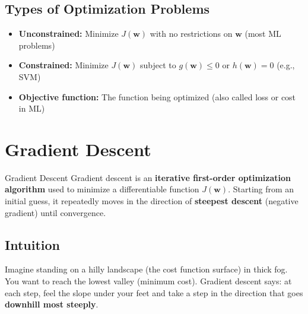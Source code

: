 \documentclass[12pt,a4paper]{report}
\begin{document}
\subsection{Types of Optimization Problems}

\begin{itemize}
  \item \textbf{Unconstrained:} Minimize $J(\mathbf{w})$ with no restrictions on $\mathbf{w}$ (most ML problems)
  \item \textbf{Constrained:} Minimize $J(\mathbf{w})$ subject to $g(\mathbf{w}) \leq 0$ or $h(\mathbf{w}) = 0$ (e.g., SVM)
  \item \textbf{Objective function:} The function being optimized (also called loss or cost in ML)
\end{itemize}

\section{Gradient Descent}

\begin{defbox}{Gradient Descent}
Gradient descent is an \textbf{iterative first-order optimization algorithm} used to minimize a differentiable function $J(\mathbf{w})$. Starting from an initial guess, it repeatedly moves in the direction of \textbf{steepest descent} (negative gradient) until convergence.
\end{defbox}

\subsection{Intuition}

Imagine standing on a hilly landscape (the cost function surface) in thick fog. You want to reach the lowest valley (minimum cost). Gradient descent says: at each step, feel the slope under your feet and take a step in the direction that goes \textbf{downhill most steeply}.
\end{document}
